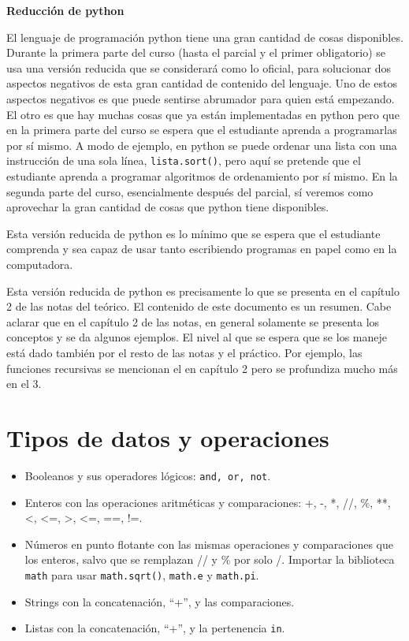\documentclass[a4paper, 12pt]{article}
\theoremstyle{definition}
\begin{document}
\centerline{\Huge\bf Reducción de python}

\vspace{2em}

El lenguaje de programación python tiene una gran cantidad de cosas disponibles. Durante la primera parte del curso (hasta el parcial y el primer obligatorio) se usa una versión reducida que se considerará como lo oficial, para solucionar dos aspectos negativos de esta gran cantidad de contenido del lenguaje. Uno de estos aspectos negativos es que puede sentirse abrumador para quien está empezando. El otro es que hay muchas cosas que ya están implementadas en python pero que en la primera parte del curso se espera que el estudiante aprenda a programarlas por sí mismo. A modo de ejemplo, en python se puede ordenar una lista con una instrucción de una sola línea, {\tt lista.sort()}, pero aquí se pretende que el estudiante aprenda a programar algoritmos de ordenamiento por sí mismo. En la segunda parte del curso, esencialmente después del parcial, sí veremos como aprovechar la gran cantidad de cosas que python tiene disponibles.

Esta versión reducida de python es lo mínimo que se espera que el estudiante comprenda y sea capaz de usar tanto escribiendo programas en papel como en la computadora.

Esta versión reducida de python es precisamente lo que se presenta en el capítulo 2 de las notas del teórico. El contenido de este documento es un resumen. Cabe aclarar que en el capítulo 2 de las notas, en general solamente se presenta los conceptos y se da algunos ejemplos. El nivel al que se espera que se los maneje está dado también por el resto de las notas y el práctico. Por ejemplo, las funciones recursivas se mencionan el en capítulo 2 pero se profundiza mucho más en el 3.


\section{Tipos de datos y operaciones}
\begin{itemize}
	\item Booleanos y sus operadores lógicos: {\tt and, or, not}.
	\item Enteros con las operaciones aritméticas y comparaciones:
	+, -, *, //, \%, **, <, <=, >, <=, ==, !=.
	\item Números en punto flotante con las mismas operaciones y comparaciones que los enteros, salvo que se remplazan // y \% por solo /. Importar la biblioteca {\tt math} para usar {\tt math.sqrt()}, {\tt math.e} y {\tt math.pi}.
	\item Strings con la concatenación, ``+'', y las comparaciones.
	\item Listas con la concatenación, ``+'', y la pertenencia {\tt in}.
\end{itemize}
\end{document}
